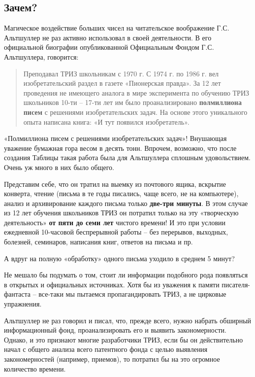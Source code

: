 \documentclass[11pt,a4paper]{article}
\begin{document}
\subsection*{Зачем?}

Магическое воздействие больших чисел на читательское воображение
Г.С. Альтшуллер не раз активно использовал в своей деятельности. В его
официальной биографии опубликованной Официальным Фондом Г.С. Альтшуллера,
говорится:
\begin{quote}
  Преподавал ТРИЗ школьникам с 1970 г. С 1974 г. по 1986 г. вел
  изобретательский раздел в газете «Пионерская правда». За 12 лет проведения
  не имеющего аналога в мире эксперимента по обучению ТРИЗ школьников 10-ти --
  17-ти лет им было проанализировано \textbf{полмиллиона писем} с решениями
  изобретательских задач. На основе этого уникального опыта написана книга: «И
  тут появился изобретатель». \cite{Altshuller1984}
\end{quote}
«Полмиллиона писем с решениями изобретательских задач»! Внушающая уважение
бумажная гора весом в десять тонн. Впрочем, возможно, что после создания
Таблицы такая работа была для Альтшуллера сплошным удовольствием. Очень уж
много в них было общего.

Представим себе, что он тратил на выемку из почтового ящика, вскрытие
конверта, чтение (письма в те годы писались, чаще всего, не на компьютере),
анализ и архивирование каждого письма только \textbf{две-три минуты}. В этом
случае из 12 лет обучения школьников ТРИЗ он потратил только на эту
«творческую деятельность» \textbf{от пяти до семи лет} чистого времени! И это
при условии ежедневной 10-часовой беспрерывной работы -- без перерывов,
выходных, болезней, семинаров, написания книг, ответов на письма и пр.

А вдруг на полную «обработку» одного письма уходило в среднем 5 минут?

Не мешало бы подумать о том, стоит ли информации подобного рода появляться в
открытых и официальных источниках. Хотя бы из уважения к памяти
писателя-фантаста -- все-таки мы пытаемся пропагандировать ТРИЗ, а не цирковые
упражнения.

Альтшуллер не раз говорил и писал, что, прежде всего, нужно набрать обширный
информационный фонд, проанализировать его и выявить закономерности. Однако, и
это признают многие разработчики ТРИЗ, если бы он действительно начал с общего
анализа всего патентного фонда с целью выявления закономерностей (например,
приемов), то потратил бы на это огромное количество времени.
\end{document}
